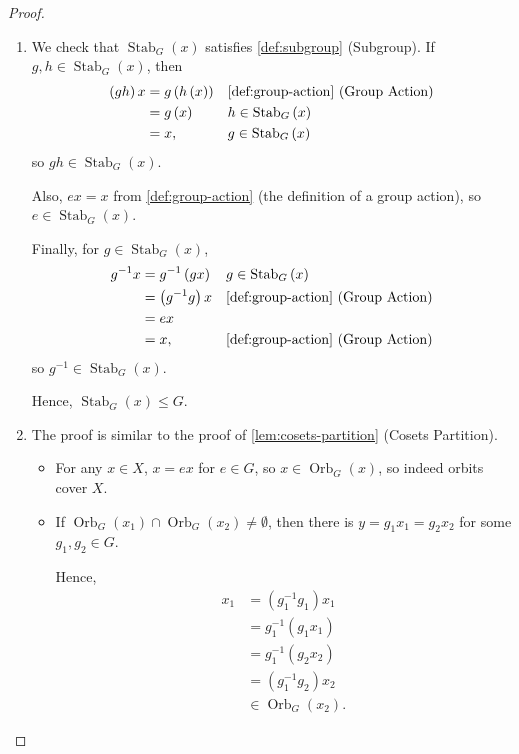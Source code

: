 \documentclass{article}
\theoremstyle{definition}
\theoremstyle{remark}
\newcommand{\pqty}[1]{\left(#1\right)}
\newcommand{\inverse}{^{-1}}
\newcommand{\subgroup}{\leq}
\newcommand{\Stab}{\operatorname{Stab}}
\newcommand{\Orb}{\operatorname{Orb}}
\begin{document}
\begin{proof}
    \begin{enumerate}
        \item We check that \(\Stab_{G} \pqty{x}\) satisfies \autoref{def:subgroup} (Subgroup). If \(g, h \in \Stab_{G}\pqty{x}\), then
        \begin{align*}
            \pqty{gh} x &= g\pqty{h\pqty{x}} && \text{\autoref{def:group-action} (Group Action)} \\
            &= g\pqty{x} && h \in \Stab_{G} \pqty{x} \\
            &= x, && g \in \Stab_{G} \pqty{x}
        \end{align*}
        so \(gh \in \Stab_{G} \pqty{x}\).

        Also, \(ex = x\) from \autoref{def:group-action} (the definition of a group action), so \(e \in \Stab_G \pqty{x}\).

        Finally, for \(g \in \Stab_G \pqty{x}\),
        \begin{align*}
            g\inverse x &= g\inverse \pqty{gx} && g \in \Stab_{G} \pqty{x} \\
            &= \pqty{g\inverse g} x && \text{\autoref{def:group-action} (Group Action)} \\
            &= ex \\
            &= x, && \text{\autoref{def:group-action} (Group Action)}
        \end{align*}
        so \(g\inverse \in \Stab_{G} \pqty{x}\).

        Hence, \(\Stab_{G} \pqty{x} \subgroup G\).

        \item The proof is similar to the proof of \autoref{lem:cosets-partition} (Cosets Partition).
        \begin{itemize}
            \item For any \(x \in X\), \(x = ex\) for \(e \in G\), so \(x \in \Orb_G \pqty{x}\), so indeed orbits cover \(X\).
            \item If \(\Orb_{G} \pqty{x_1} \cap \Orb_{G} \pqty{x_2} \neq \emptyset\), then there is \(y = g_1 x_1 = g_2 x_2\) for some \(g_1, g_2 \in G\).
        
            Hence,
            \begin{align*}
                x_1 &= \pqty{g_1 \inverse g_1} x_1 \\
                &= g_1 \inverse \pqty{g_1 x_1} \\
                &= g_1 \inverse \pqty{g_2 x_2} \\
                &= \pqty{g_1 \inverse g_2} x_2 \\
                &\in \Orb_{G} \pqty{x_2}.
            \end{align*}


\end{itemize}
\end{enumerate}
\end{proof}
\end{document}
